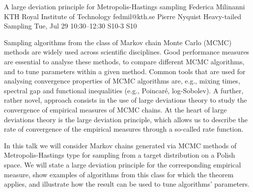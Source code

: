 \begin{talk}
  {A large deviation principle for Metropolis-Hastings sampling}%
  {Federica Milinanni}%
  {KTH Royal Institute of Technology}%
  {fedmil@kth.se}%
  {Pierre Nyquist}%
  {Heavy-tailed Sampling}%
  {Tue, Jul 29 10:30–12:30}%
  {S10-3}%
  {S10}%
				
			
			
Sampling algorithms from the class of Markov chain Monte Carlo (MCMC) methods are widely used across scientific disciplines. Good performance measures are essential to analyse these methods, to compare different MCMC algorithms, and to tune parameters within a given method. Common tools that are used for analysing convergence properties of MCMC algorithms are, e.g., mixing times, spectral gap and functional inequalities (e.g., Poincaré, log-Sobolev). A further, rather novel, approach consists in the use of large deviations theory to study the convergence of empirical measures of MCMC chains. At the heart of large deviations theory is the large deviation principle, which allows us to describe the rate of convergence of the empirical measures through a so-called rate function.

In this talk we will consider Markov chains generated via MCMC methods of Metropolis-Hastings type for sampling from a target distribution on a Polish space. We will state a large deviation principle for the corresponding empirical measure, show examples of algorithms from this class for which the theorem applies, and illustrate how the result can be used to tune algorithms' parameters.

\medskip

\end{talk}

